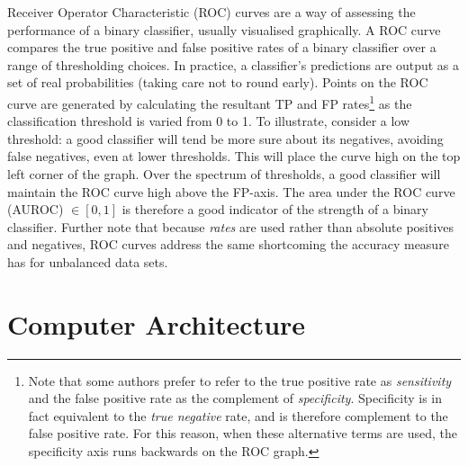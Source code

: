 \documentclass[11pt]{amsart}
\begin{document}
Receiver Operator Characteristic (ROC) curves are a way of assessing the performance of a binary classifier, usually visualised graphically. A ROC curve compares the true positive and false positive rates of a binary classifier over a range of thresholding choices. In practice, a classifier's predictions are output as a set of real probabilities (taking care not to round early). Points on the ROC curve are generated by calculating the resultant TP and FP rates\footnote{Note that some authors prefer to refer to the true positive rate as \emph{sensitivity} and the false positive rate as the complement of \emph{specificity}. Specificity is in fact equivalent to the \emph{true negative} rate, and is therefore complement to the false positive rate. For this reason, when these alternative terms are used, the specificity axis runs backwards on the ROC graph.} as the classification threshold is varied from 0 to 1. To illustrate, consider a low threshold: a good classifier will tend be more sure about its negatives, avoiding false negatives, even at lower thresholds. This will place the curve high on the top left corner of the graph. Over the spectrum of thresholds, a good classifier will maintain the ROC curve high above the FP-axis. The area under the ROC curve (AUROC) $\in [0, 1]$ is therefore a good indicator of the strength of a binary classifier. Further note that because \emph{rates} are used rather than absolute positives and negatives, ROC curves address the same shortcoming the accuracy measure has for unbalanced data sets.

\section{Computer Architecture}
\end{document}
